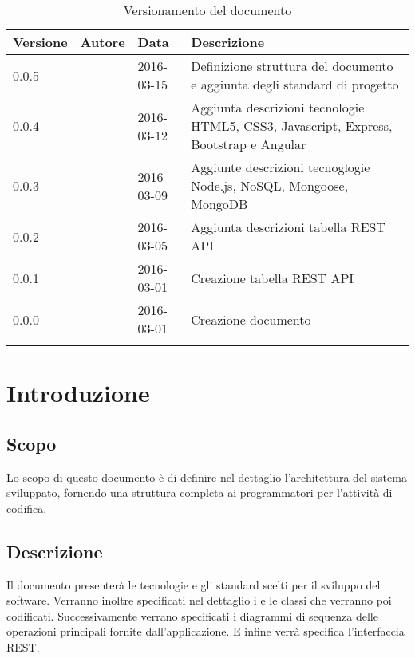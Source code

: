 \documentclass[12pt,a4paper]{article}
\begin{document}
\begin{center}
	\begin{longtable}[H]{p{} p{} p{} p{}}
		\toprule
		\textbf{Versione}	&	\textbf{Autore}	&	\textbf{Data}	&	\textbf{Descrizione}\\*
		\midrule
        \midrule
        0.0.5 & \TP{} & 2016-03-15 & Definizione struttura del documento e aggiunta
            degli standard di progetto \\*
		\midrule
		0.0.4 & \AVE{} & 2016-03-12 & Aggiunta descrizioni tecnologie HTML5, CSS3, Javascript, 
            Express, Bootstrap e Angular \\*
		\midrule
		0.0.3 & \AVE{} & 2016-03-09 & Aggiunte descrizioni tecnoglogie Node.js, NoSQL, Mongoose, MongoDB \\*
		\midrule
		0.0.2 & \AVI{} & 2016-03-05 &  Aggiunta descrizioni tabella REST API \\*
		\midrule
		0.0.1 & \NDC{} & 2016-03-01 &  Creazione tabella REST API \\*
		\midrule
		0.0.0 & \NDC{} & 2016-03-01 &  Creazione documento \\*
		\bottomrule
		\caption{Versionamento del documento}
		\label{tabVers1} 
	\end{longtable}
\end{center}

\newpage
\tableofcontents
\newpage
\listoftables
\listoffigures
\newpage

\section{Introduzione}	\label{intro}
\subsection{Scopo}
Lo scopo di questo documento è di definire nel dettaglio l'architettura del sistema sviluppato, fornendo
una struttura completa ai programmatori per l'attività di codifica.

\subsection{Descrizione}
Il documento presenterà le tecnologie e gli standard scelti per il sviluppo del software. Verranno inoltre specificati
nel dettaglio i  e le classi che verranno poi codificati. Successivamente verrano specificati i diagrammi
di sequenza delle operazioni principali fornite dall'applicazione. E infine verrà specifica l'interfaccia REST.
\end{document}

